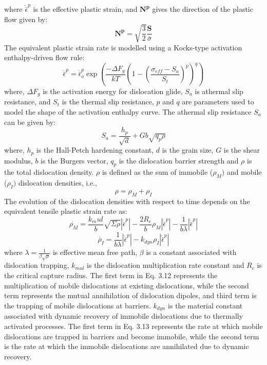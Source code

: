 where $\dot{\bar{\epsilon}}^p$ is the effective plastic strain, and $\boldsymbol{N^p}$ gives the direction of the plastic flow given by:
\begin{equation}
   \boldsymbol{N^p} =  \sqrt{\frac{3}{2}}\frac{\boldsymbol{S}}{\bar{\sigma}}
\end{equation}
The equivalent plastic strain rate is modelled using a Kocks-type activation enthalpy-driven flow rule:
\begin{equation}
\dot{\bar{\epsilon}}^p = \dot{\bar{\epsilon}}^p_o\exp\left(\frac{-\Delta F_g}{kT}\left(1 - \left(\frac{\sigma_{eff} - S_a}{S_t}\right)^p\right)^q\right)
\end{equation}
where, $\Delta F_g$ is the activation energy for dislocation glide, $S_a$ is athermal slip resistance, and $S_t$ is the thermal slip resistance, $p$ and $q$ are parameters used to model the shape of the activation enthalpy curve. The athermal slip resistance $S_a$ can be given by:
\begin{equation}
    S_a = \frac{h_p}{\sqrt{d}} + Gb\sqrt{q_p\rho}
\end{equation}
where, $h_p$ is the Hall-Petch hardening constant, $d$ is the grain size, $G$ is the shear modulus, $b$ is the Burgers vector, $q_p$ is the dislocation barrier strength and $\rho$ is the total dislocation density. $\rho$ is defined as the sum of immobile ($\rho_M)$ and mobile ($\rho_I)$ dislocation densities, i.e., 
\begin{equation}
    \rho = \rho_M + \rho_I
\end{equation}
The evolution of the dislocation densities with respect to time depends on the equivalent tensile plastic strain rate as:
\begin{equation}
\dot{\rho_M} = \frac{k_mul}{b}\sqrt{\Sigma\rho}|\dot{\bar{\epsilon}}^p| - \frac{2R_c}{b}\rho_M|\dot{\bar{\epsilon}}^p| - \frac{1}{b\lambda}|\dot{\bar{\epsilon}}^p|
\end{equation}
\begin{equation}
\dot{\rho_I} = \frac{1}{b\lambda}|\dot{\bar{\epsilon}}^p| - k_{dyn}\rho_I|\dot{\bar{\epsilon}}^p|
\end{equation}
where $\lambda = \frac{1}{\beta\sqrt{\rho}}$ is effective mean free path, $\beta$ is a constant associated with dislocation trapping, $k_{mul}$ is the dislocation multiplication rate constant and $R_c$ is the critical capture radius. The first term in Eq. 3.12 represents the multiplication of mobile dislocations at existing dislocations, while the second term represents the mutual annihilation of dislocation dipoles, and third term is the trapping of mobile dislocations at barriers. $k_{dyn}$ is the material constant associated with dynamic recovery of immobile dislocations due to thermally activated processes. The first term in Eq. 3.13 represents the rate at which mobile dislocations are trapped in barriers and become immobile, while the second term is the rate at which the immobile dislocations are annihilated due to dynamic recovery.

